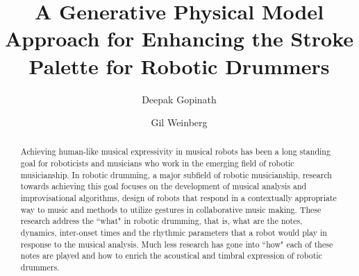 \documentclass[final,1p,times]{elsarticle}
\begin{document}
\begin{frontmatter}


\title{A Generative Physical Model Approach for Enhancing the Stroke Palette for Robotic Drummers}

 \author[gt]{Deepak Gopinath}
 
 \author[gt]{Gil Weinberg}
 
  
%
   \address[gt]{Georgia Tech Center for Music Technology, Georgia Tech, Atlanta, GA, 30318, USA}

\begin{abstract}
	Achieving human-like musical expressivity in musical robots has been a long standing goal for roboticists and musicians who work in the emerging field of robotic musicianship. In robotic drumming, a major subfield of robotic musicianship, research towards achieving this goal focuses on the development of musical analysis and improvisational algorithms, design of robots that respond in a contextually appropriate way to music and methods to utilize gestures in collaborative music making. These research address the ``what" in robotic drumming, that is, what are the notes, dynamics, inter-onset times and the rhythmic parameters that a robot would play in response to the musical analysis. Much less research has gone into ``how" each of these notes are played and how to enrich the acoustical and timbral expression of robotic drummers.
	

\end{abstract}
\end{frontmatter}
\end{document}
